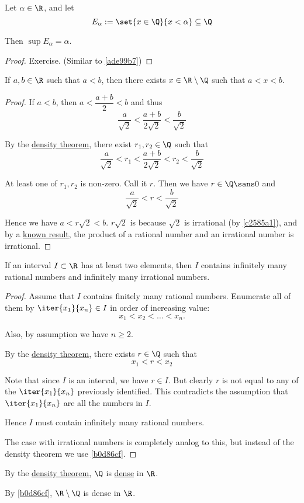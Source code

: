 \Corollary{}\label{d4d76b6}

Let $\alpha\in\R$, and let
$$
  E_\alpha:=\set{x\in\Q}{x<\alpha}\subseteq\Q
$$

Then $\sup E_\alpha=\alpha$.

\begin{proof}
  Exercise. (Similar to \autoref{ade99b7})
\end{proof}

\Corollary{}\label{b0d86cf}

If $a,b\in\R$ such that $a<b$, then there exists $x\in\R\setminus\Q$ such that
$a<x<b$.

\begin{proof}
  If $a<b$, then $a<\dfrac{a+b}2<b$ and thus
  $$
    \frac a{\sqrt2}<\frac{a+b}{2\sqrt2}<\frac b{\sqrt2}
  $$

  By the \href{d0c9c52}{density theorem}, there exist $r_1,r_2\in\Q$ such that
  $$
    \frac a{\sqrt2}<r_1<\frac{a+b}{2\sqrt2}<r_2<\frac b{\sqrt2}
  $$

  At least one of $r_1,r_2$ is non-zero. Call it $r$. Then we have
  $r\in\Q\sans0$ and
  $$
    \frac a{\sqrt2}<r<\frac b{\sqrt2}
  $$

  Hence we have $a<r\sqrt2<b$. $r\sqrt2$ is because $\sqrt2$ is irrational (by
  \autoref{c2585a1}), and by a \href{d9d3f10}{known result}, the product of a
  rational number and an irrational number is irrational.
\end{proof}

\Corollary{}\label{e43d143}

If an interval $I\subset\R$ has at least two elements, then $I$ contains
infinitely many rational numbers and infinitely many irrational numbers.

\begin{proof}
  \def\all{\iter{x_1}{x_n}}

  Assume that $I$ contains finitely many rational numbers. Enumerate all of
  them by $\all\in I$ in order of increasing value:
  $$
    x_1<x_2<\ldots<x_n.
  $$

  Also, by assumption we have $n\geq2$.

  By the \href{d0c9c52}{density theorem}, there exists $r\in\Q$ such that
  $$
    x_1<r<x_2
  $$

  Note that since $I$ is an interval, we have $r\in I$. But clearly $r$ is not
  equal to any of the $\all$ previously identified. This contradicts the
  assumption that $\all$ are all the numbers in $I$.

  Hence $I$ must contain infinitely many rational numbers.

  The case with irrational numbers is completely analog to this, but instead of
  the density theorem we use \autoref{b0d86cf}.
\end{proof}

\Remark{}\label{bb3cf6b}

\begin{enumerati}
  \item By the \href{d0c9c52}{density theorem}, $\Q$ is \href{e929c5e}{dense}
        in $\R$.
  \item By \autoref{b0d86cf}, $\R\setminus\Q$ is dense in $\R$.
\end{enumerati}
